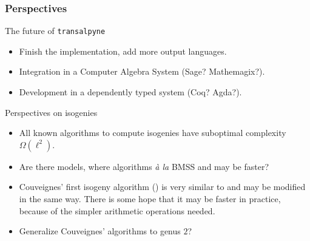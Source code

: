 \documentclass[10pt,usepdftitle=false]{beamer}
\begin{document}
\begin{frame}
  \frametitle{Perspectives}

  \begin{block}{The future of \texttt{transalpyne}}
    \begin{itemize}
    \item Finish the implementation, add more output languages.
    \item Integration in a Computer Algebra System (Sage?
      Mathemagix?).
    \item Development in a dependently typed system (Coq? Agda?).
    \end{itemize}
  \end{block}

  \begin{block}{Perspectives on isogenies}
    \begin{itemize}
    \item All known algorithms to compute isogenies have suboptimal
      complexity $\Omega(\ell^2)$.
    \item Are there models, where algorithms \textit{à la} BMSS and
      \cite{lercier+sirvent08} may be faster?
    \item Couveignes' first isogeny algorithm (\cite{couveignes94}) is
      very similar to \cite{couveignes96} and may be modified in the
      same way. There is some hope that it may be faster in practice,
      because of the simpler arithmetic operations needed.
    \item Generalize Couveignes' algorithms to genus $2$?
    \end{itemize}
  \end{block}
\end{frame}
\end{document}
